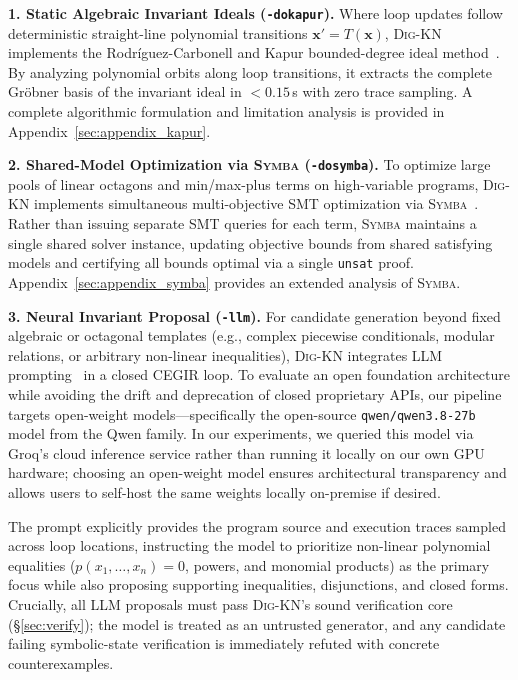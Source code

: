\documentclass[runningheads]{llncs}
\newcommand{\tool}{\textsc{Dig-KN}\xspace}
\newcommand{\code}[1]{\texttt{\small #1}}
\begin{document}
\medskip\noindent\textbf{1. Static Algebraic Invariant Ideals (\code{-dokapur}).}
\label{sec:static}
Where loop updates follow deterministic straight-line polynomial transitions $\mathbf{x}' = T(\mathbf{x})$, \tool{} implements the Rodr\'iguez-Carbonell and Kapur bounded-degree ideal method~\cite{rodriguez2007kapur,rodriguez2007simple}. By analyzing polynomial orbits along loop transitions, it extracts the complete Gr\"obner basis of the invariant ideal in $<0.15$\,s with zero trace sampling.  A complete algorithmic formulation and limitation analysis is provided in Appendix~\ref{sec:appendix_kapur}.

\medskip\noindent\textbf{2. Shared-Model Optimization via \textsc{Symba} (\code{-dosymba}).}
\label{sec:symba_inf}
To optimize large pools of linear octagons and min/max-plus terms on high-variable programs, \tool{} implements simultaneous multi-objective SMT optimization via \textsc{Symba}~\cite{li2014symba}. Rather than issuing separate SMT queries for each term, \textsc{Symba} maintains a single shared solver instance, updating objective bounds from shared satisfying models and certifying all bounds optimal via a single \code{unsat} proof. Appendix~\ref{sec:appendix_symba} provides an extended analysis of \textsc{Symba}.

\medskip\noindent\textbf{3. Neural Invariant Proposal (\code{-llm}).}
\label{sec:llm}
For candidate generation beyond fixed algebraic or octagonal templates (e.g., complex piecewise conditionals, modular relations, or arbitrary non-linear inequalities), \tool{} integrates LLM prompting~\cite{pei2023llminv,kamath2023loopy,wu2024lemur} in a closed CEGIR loop. To evaluate an open foundation architecture while avoiding the drift and deprecation of closed proprietary APIs, our pipeline targets open-weight models---specifically the open-source \code{qwen/qwen3.8-27b} model from the Qwen family. In our experiments, we queried this model via Groq's cloud inference service rather than running it locally on our own GPU hardware; choosing an open-weight model ensures architectural transparency and allows users to self-host the same weights locally on-premise if desired.

The prompt explicitly provides the program source and execution traces sampled across loop locations, instructing the model to prioritize non-linear polynomial equalities ($p(x_1, \dots, x_n) = 0$, powers, and monomial products) as the primary focus while also proposing supporting inequalities, disjunctions, and closed forms. Crucially, all LLM proposals must pass \tool{}'s sound verification core (\S\ref{sec:verify}); the model is treated as an untrusted generator, and any candidate failing symbolic-state verification is immediately refuted with concrete counterexamples.
\end{document}
